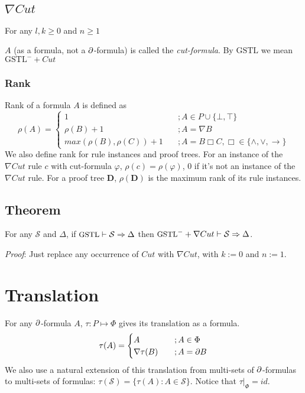 \subsection{$\nabla Cut$} For any $l,k \ge 0$ and $n \ge 1$
\begin{prooftree}
\end{prooftree}
$A$ (as a formula, not a $\p$-formula) is called the \textit{cut-formula}.
By $\text{GSTL}$ we mean $\text{GSTL}^- + Cut$
\subsubsection{Rank} Rank of a formula $A$ is defined as
\[ \rho(A) = \begin{cases}
1 & \quad ; A \in P \cup \{ \bot, \top \} \\
\rho(B) + 1 & \quad ; A = \nabla B \\
max(\rho(B), \rho(C)) + 1 & \quad ; A = B \Box C, \Box \in \{ \land , \lor, \rightarrow \}
\end{cases} \]
We also define rank for rule instances and proof trees. For an instance of the $\nabla Cut$ rule $c$ with cut-formula $\varphi$, $\rho(c) = \rho(\varphi)$, $0$ if it's not an instance of the $\nabla Cut$ rule.
For a proof tree $\mathbf{D}$, $\rho(\mathbf{D})$ is the maximum rank of its rule instances.

\subsection{Theorem} For any $\mathcal{S}$ and $\Delta$, if $\small\text{GSTL} \vdash \mathcal{S} \Rightarrow \Delta$ then $\small\text{GSTL}^- + \nabla Cut \vdash \mathcal{S} \Rightarrow \Delta$.

\textit{Proof}: Just replace any occurrence of $Cut$ with $\nabla Cut$, with $k := 0$ and $n := 1$.

\section{Translation} For any $\p$-formula $A$, $\tau : P \mapsto \Phi$ gives its translation as a formula.
\[ \tau(A) = \begin{cases}
	A & \quad ; A \in \Phi \\
	\nabla \tau(B) & \quad ; A = \p B
\end{cases} \]
We also use a natural extension of this translation from multi-sets of $\p$-formulas to multi-sets of formulas: $\tau(\mathcal{S}) = \{ \tau(A) : A \in \mathcal{S} \}$. Notice that $\tau|_\Phi = id$.


